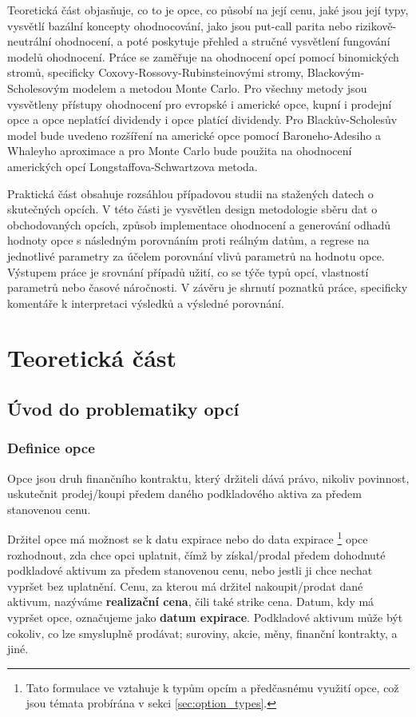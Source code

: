 \documentclass[male,czech,api_bc]{kitheses}
\begin{document}
  Teoretická část objasňuje, co to je opce, co působí na její cenu, jaké jsou její typy, vysvětlí bazální koncepty ohodnocování, jako jsou put-call parita nebo rizikově-neutrální ohodnocení, a poté poskytuje přehled a stručné vysvětlení fungování modelů ohodnocení.
  Práce se zaměřuje na ohodnocení opcí pomocí binomických stromů, specificky Coxovy-Rossovy-Rubinsteinovými stromy, Blackovým-Scholesovým modelem a metodou Monte Carlo. Pro všechny metody jsou vysvětleny přístupy ohodnocení pro evropské i americké opce, kupní i prodejní opce a opce neplatící dividendy i opce platící dividendy. Pro Blackův-Scholesův model bude uvedeno rozšíření na americké opce pomocí Baroneho-Adesiho a Whaleyho aproximace a pro Monte Carlo bude použita na ohodnocení amerických opcí Longstaffova-Schwartzova metoda.

  Praktická část obsahuje rozsáhlou případovou studii na stažených datech o skutečných opcích. V této části je vysvětlen design metodologie sběru dat o obchodovaných opcích, způsob implementace ohodnocení a generování odhadů hodnoty opce s následným porovnáním proti reálným datům, a regrese na jednotlivé parametry za účelem porovnání vlivů parametrů na hodnotu opce.
  Výstupem práce je srovnání případů užití, co se týče typů opcí, vlastností parametrů nebo časové náročnosti. V závěru je shrnutí poznatků práce, specificky komentáře k interpretaci výsledků a výsledné porovnání.



\chapter{Teoretická část}

\section{Úvod do problematiky opcí}

  \subsection{Definice opce}

  Opce jsou druh finančního kontraktu, který držiteli dává právo, nikoliv povinnost, uskutečnit prodej/koupi předem daného podkladového aktiva za předem stanovenou cenu. 

  Držitel opce má možnost se k datu expirace nebo do data expirace \footnote{Tato formulace ve vztahuje k typům opcím a předčasnému využití opce, což jsou témata probírána v sekci \ref{sec:option_types}. } opce rozhodnout, zda chce opci uplatnit, čímž by získal/prodal předem dohodnuté podkladové aktivum za předem stanovenou cenu, nebo jestli ji chce nechat vypršet bez uplatnění. Cenu, za kterou má držitel nakoupit/prodat dané aktivum, nazýváme \textbf{realizační cena}, čili také strike cena. Datum, kdy má vypršet opce, označujeme jako \textbf{datum expirace}. Podkladové aktivum může být cokoliv, co lze smysluplně prodávat; suroviny, akcie, měny, finanční kontrakty, a jiné.
\end{document}
